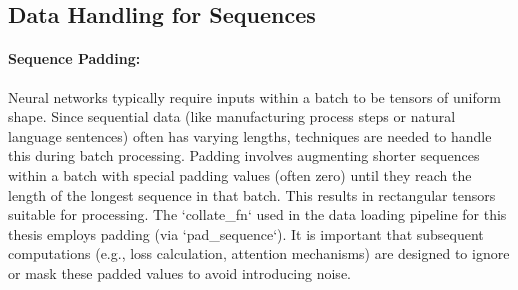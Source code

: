 \subsection{Data Handling for Sequences}

\paragraph{Sequence Padding:}
Neural networks typically require inputs within a batch to be tensors of uniform shape. Since sequential data (like manufacturing process steps or natural language sentences) often has varying lengths, techniques are needed to handle this during batch processing. Padding involves augmenting shorter sequences within a batch with special padding values (often zero) until they reach the length of the longest sequence in that batch. This results in rectangular tensors suitable for processing. The `collate_fn` used in the data loading pipeline for this thesis employs padding (via `pad_sequence`). It is important that subsequent computations (e.g., loss calculation, attention mechanisms) are designed to ignore or mask these padded values to avoid introducing noise.

